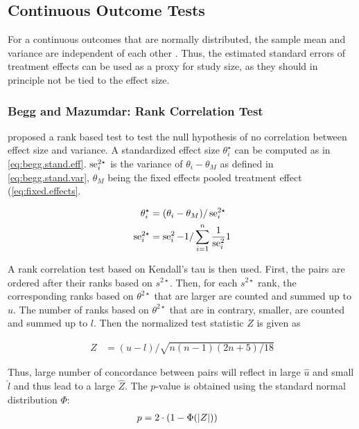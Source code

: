 \documentclass[11pt,a4paper,twoside]{book}\usepackage[]{graphicx}\usepackage[]{color}
\begin{document}
\subsection{Continuous Outcome Tests}
For a continuous outcomes that are normally distributed, the sample mean and variance are independent of each other \cite[120]{meta.w.R}. Thus, the estimated standard errors of treatment effects can be used as a proxy for study size, as they should in principle not be tied to the effect size.

\subsubsection{Begg and Mazumdar: Rank Correlation Test} \label{sec:Begg}
\citet{begg.ties} proposed a rank based test to test the null hypothesis of no correlation between effect size and variance.
A standardized effect size $\theta_i^\star$ can be computed as in \eqref{eq:begg.stand.eff}. $\operatorname{se}_i^{2\star}$ is the variance of $\theta_i - \theta_M$ as defined in \eqref{eq:begg.stand.var}, $\theta_M$ being the fixed effects pooled treatment effect (\eqref{eq:fixed.effects}. 

\begin{align}
\theta_i^\star &= (\theta_i - \theta_M)/\operatorname{se}_i^{2\star} \label{eq:begg.stand.eff}  \\
\operatorname{se}_i^{2\star} &= \operatorname{se}_i^2 - 1/\sum_{i = 1}^n\frac{1}{\operatorname{se}_i^2}1 \label{eq:begg.stand.var} 
\end{align}

A rank correlation test based on Kendall's tau is then used. First, the pairs are ordered after their ranks based on $s^{2\star}$. Then, for each $s^{2\star}$ rank, the corresponding ranks based on $\theta^{2\star}$ that are larger are counted and summed up to $u$. The number of ranks based on $\theta^{2\star}$ that are in contrary, smaller, are counted and summed up to $l$. Then the normalized test statistic $Z$ is given as

\begin{align}
Z &= (u - l)/\sqrt{n(n-1)(2n + 5)/18} \nonumber
\end{align}

Thus, large number of concordance between pairs will reflect in large $\hat{u}$ and small $\hat{l}$ and thus lead to a large $\hat{Z}$. The $p$-value is obtained using the standard normal distribution $\Phi$:
\begin{align}
p &= 2\cdot(1-\Phi(\left\lvert Z\right\rvert)) \nonumber
\end{align}
\end{document}
